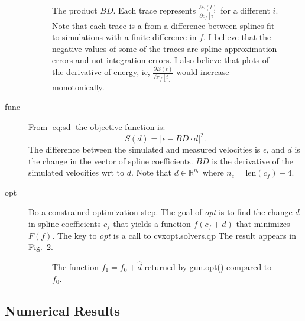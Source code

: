 \documentclass[11pt]{article}
\newcommand{\field}[1]{\mathbb{#1}}
\newcommand\REAL{\field{R}}
\begin{document}
\begin{description}
\begin{figure}
    \caption{The product $B D$.  Each trace represents
      $\frac{\partial v(t)}{\partial c_f[i]}$ for a different $i$.
      Note that each trace is a from a difference between splines fit
      to simulations with a finite difference in $f$.  I believe that
      the negative values of some of the traces are spline
      approximation errors and not integration errors.  I also believe
      that plots of the derivative of energy, ie,
      $\frac{\partial E(t)}{\partial c_f[i]}$ would increase
      monotonically.}
    \label{fig:BD_test}
  \end{figure}
\item[func] From \eqref{eq:sd} the objective function is:
  \begin{equation*}
    S(d) = \left| \epsilon - BD\cdot d \right|^2.
  \end{equation*}
  The difference between the simulated and measured velocities is
  $\epsilon$, and $d$ is the change in the vector of spline
  coefficients.  $BD$ is the derivative of the simulated velocities
  wrt to $d$.  Note that $d\in \REAL^{n_c}$ where $n_c = \text{len}(c_f)-4$.
\item[opt] Do a constrained optimization step.  The goal of \emph{opt}
  is to find the change $d$ in spline coefficients $c_f$ that yields a
  function $f(c_f+d)$ that minimizes $F(f)$.  The key to \emph{opt} is
  a call to cvxopt.solvers.qp
   The result appears in
  Fig.~\ref{fig:opt_result}.
  \begin{figure}
    \centering
    \caption{The function $f_1 = f_0 + \hat d$ returned by gun.opt()
      compared to $f_0$.}
    \label{fig:opt_result}
  \end{figure}
\end{description}

\subsection{Numerical Results}
\label{sec:numerical-results}
\end{document}

